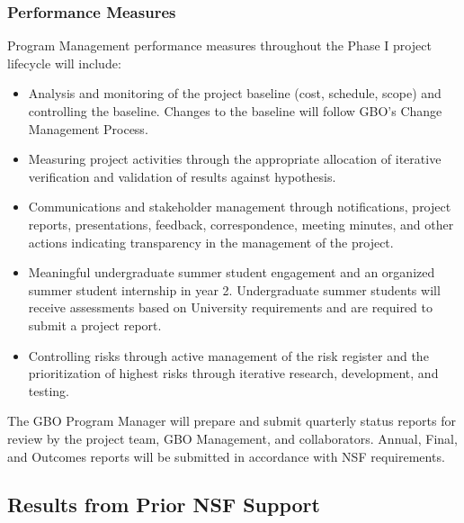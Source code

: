 \documentclass[10pt]{myNSF}
\begin{document}
\subsubsection{Performance Measures}
\label{sec:performance_measures}

Program Management performance measures throughout the Phase {\sc I}
project lifecycle will include:
\begin{itemize}
\item{Analysis and monitoring of the project baseline (cost, schedule,
    scope) and controlling the baseline.  Changes to the baseline will
    follow GBO’s Change Management Process.}
\item{Measuring project activities through the appropriate allocation
    of iterative verification and validation of results against
    hypothesis.}
\item{Communications and stakeholder management through notifications,
    project reports, presentations, feedback, correspondence, meeting
    minutes, and other actions indicating transparency in the
    management of the project.}
\item{Meaningful undergraduate summer student engagement and an
    organized summer student internship in year 2. Undergraduate summer
    students will receive assessments based on University requirements
    and are required to submit a project report.}
\item{Controlling risks through active management of the risk register
    and the prioritization of highest risks through iterative
    research, development, and testing.}
\end{itemize}
The GBO Program Manager will prepare and submit quarterly status
reports for review by the project team, GBO Management, and
collaborators. Annual, Final, and Outcomes reports will be submitted
in accordance with NSF requirements.


\subsection{Results from Prior NSF Support}
\label{sec:prior_support}
\end{document}

